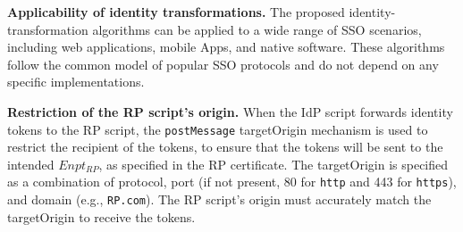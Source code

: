 
\oldc

\noindent \textbf{Applicability of identity transformations.}
The proposed identity-transformation algorithms %
can be applied to a wide range of SSO scenarios, including web applications, mobile Apps, and native software.
These algorithms follow the common model of popular SSO protocols and do not depend on any specific implementations. %

\noindent \textbf{Restriction of the RP script's origin.}
When the IdP script forwards identity tokens to the RP script, the \verb+postMessage+ targetOrigin mechanism \cite{postm-targeto} is used to restrict the recipient of the tokens, to ensure that the tokens will be sent to the intended $Enpt_{RP}$, as specified in the RP certificate. The targetOrigin is specified as a combination of protocol, port (if not present, 80 for \verb+http+ and 443 for \verb+https+), and domain (e.g., \verb+RP.com+).
The RP script's origin must accurately match the targetOrigin to receive the tokens.

